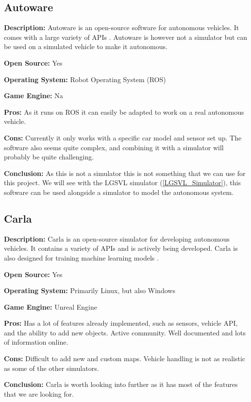 \subsection{Autoware} \label{Autoware}
\textbf{Description:} Autoware is an open-source software for autonomous vehicles. It comes with a large variety of APIs  \cite{Autoware_doc_Website}. Autoware is however not a simulator but can be used on a simulated vehicle to make it autonomous.

\textbf{Open Source:} Yes

\textbf{Operating System:} Robot Operating System (ROS)

\textbf{Game Engine:} Na

\textbf{Pros:} As it runs on ROS it can easily be adapted to work on a real autonomous vehicle.

\textbf{Cons:} Currently it only works with a specific car model and sensor set up. The software also seems quite complex, and combining it with a simulator will probably be quite challenging.

\textbf{Conclusion:} As this is not a simulator this is not something that we can use for this project. We will see with the LGSVL simulator (\ref{LGSVL_Simulator}), this software can be used alongside a simulator to model the autonomous system. 


\subsection{Carla} \label{Carla}
\textbf{Description:} Carla is an open-source simulator for developing autonomous vehicles. It contains a variety of APIs and is actively being developed. Carla is also designed for training machine learning models \cite{CarlaPaper}. 

\textbf{Open Source:} Yes

\textbf{Operating System:} Primarily Linux, but also Windows

\textbf{Game Engine:} Unreal Engine

\textbf{Pros:} Has a lot of features already implemented, such as sensors, vehicle API, and the ability to add new objects. Active community. Well documented and lots of information online. 

\textbf{Cons:} Difficult to add new and custom maps. Vehicle handling is not as realistic as some of the other simulators.

\textbf{Conclusion:} Carla is worth looking into further as it has most of the features that we are looking for.


